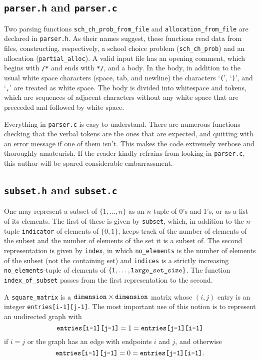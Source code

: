 \documentclass[12pt]{article}
\theoremstyle{definition}
\begin{document}
\begin{appendix}
\subsection{\texttt{parser.h} and \texttt{parser.c}}

Two parsing functions \texttt{sch\_ch\_prob\_from\_file} and
\texttt{allocation\_from\_file} are declared in \texttt{parser.h}.  As
their names suggest, these functions read data from files,
constructing, respectively, a school choice problem
(\texttt{sch\_ch\_prob}) and an allocation (\texttt{partial\_alloc}).
A valid input file has an opening comment, which begins with
\texttt{/*} and ends with \texttt{*/}, and a body.  In the body, in
addition to the usual white space characters (space, tab, and newline)
the characters `\texttt{(}', `\texttt{)}', and `\texttt{,}' are
treated as white space.  The body is divided into whitespace and
tokens, which are sequences of adjacent characters without any white
space that are preceeded and followed by white space.

Everything in \texttt{parser.c} is easy to understand.  There are
numerous functions checking that the verbal tokens are the ones that
are expected, and quitting with an error message if one of them
isn't. This makes the code extremely verbose and thoroughly
amateurish.  If the reader kindly refrains from looking in
\texttt{parser.c}, this author will be spared considerable
embarrassment.

\subsection{\texttt{subset.h} and \texttt{subset.c}}

One may represent a subset of $\{1, \ldots, n\}$ as an $n$-tuple of
0's and 1's, or as a list of its elements.  The first of these is
given by \texttt{subset}, which, in addition to the $n$-tuple
\texttt{indicator} of elements of $\{0,1\}$, keeps track of the number
of elements of the subset and the number of elements of the set it is
a subset of.  The second representation is given by \texttt{index}, in
which \texttt{no\_elements} is the number of elements of the subset
(not the containing set) and \texttt{indices} is a strictly increasing
\texttt{no\_elements}-tuple of elements of $\{1, \ldots,
\text{\texttt{large\_set\_size}}\}$.  The function
\texttt{index\_of\_subset} passes from the first representation to the
second.

A \texttt{square\_matrix} is a $\text{\texttt{dimension}} \times
\texttt{dimension}$ matrix whose $(i,j)$ entry is an integer
\texttt{entries[i-1][j-1]}.  The most important use of this notion is
to represent an undirected graph with
$$\text{\texttt{entries[i-1][j-1]}} = 1 =
\text{\texttt{entries[j-1][i-1]}}$$ if $i = j$ or the graph has an
edge with endpoints $i$ and $j$, and otherwise
$$\text{\texttt{entries[i-1][j-1]}} = 0 =
\text{\texttt{entries[j-1][i-1]}}.$$


\end{appendix}
\end{document}
